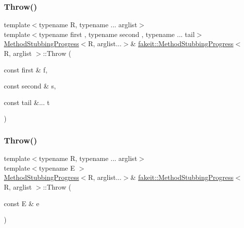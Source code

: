\mbox{\label{structfakeit_1_1MethodStubbingProgress_a516a0ade529c61e4ab6df1bf47f3f1b2}} 
\subsubsection{\texorpdfstring{Throw()}{Throw()}\hspace{0.1cm}{\footnotesize\ttfamily [3/27]}}
{\footnotesize\ttfamily template$<$typename R, typename ... arglist$>$ \\
template$<$typename first , typename second , typename ... tail$>$ \\
\mbox{\hyperlink{structfakeit_1_1MethodStubbingProgress}{Method\+Stubbing\+Progress}}$<$R, arglist...$>$\& \mbox{\hyperlink{structfakeit_1_1MethodStubbingProgress}{fakeit\+::\+Method\+Stubbing\+Progress}}$<$ R, arglist $>$\+::Throw (\begin{DoxyParamCaption}\item[{const first \&}]{f,  }\item[{const second \&}]{s,  }\item[{const tail \&...}]{t }\end{DoxyParamCaption})\hspace{0.3cm}{\ttfamily [inline]}}

\mbox{\label{structfakeit_1_1MethodStubbingProgress_ae3da30d02ba5de4bfa82f51bba5602c3}} 
\subsubsection{\texorpdfstring{Throw()}{Throw()}\hspace{0.1cm}{\footnotesize\ttfamily [4/27]}}
{\footnotesize\ttfamily template$<$typename R, typename ... arglist$>$ \\
template$<$typename E $>$ \\
\mbox{\hyperlink{structfakeit_1_1MethodStubbingProgress}{Method\+Stubbing\+Progress}}$<$R, arglist...$>$\& \mbox{\hyperlink{structfakeit_1_1MethodStubbingProgress}{fakeit\+::\+Method\+Stubbing\+Progress}}$<$ R, arglist $>$\+::Throw (\begin{DoxyParamCaption}\item[{const E \&}]{e }\end{DoxyParamCaption})\hspace{0.3cm}{\ttfamily [inline]}}

